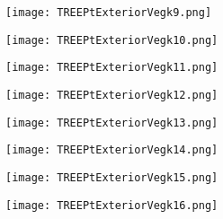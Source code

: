 \documentclass[pdf]{beamer}
\begin{document}
\begin{frame}
\begin{figure}[!h]
\centering
\texttt{[image: TREEPtExteriorVegk9.png]}
\end{figure}
\end{frame}

\begin{frame}
\begin{figure}[!h]
\centering
\texttt{[image: TREEPtExteriorVegk10.png]}
\end{figure}
\end{frame}

\begin{frame}
\begin{figure}[!h]
\centering
\texttt{[image: TREEPtExteriorVegk11.png]}
\end{figure}
\end{frame}

\begin{frame}
\begin{figure}[!h]
\centering
\texttt{[image: TREEPtExteriorVegk12.png]}
\end{figure}
\end{frame}

\begin{frame}
\begin{figure}[!h]
\centering
\texttt{[image: TREEPtExteriorVegk13.png]}
\end{figure}
\end{frame}

\begin{frame}
\begin{figure}[!h]
\centering
\texttt{[image: TREEPtExteriorVegk14.png]}
\end{figure}
\end{frame}

\begin{frame}
\begin{figure}[!h]
\centering
\texttt{[image: TREEPtExteriorVegk15.png]}
\end{figure}
\end{frame}

\begin{frame}
\begin{figure}[!h]
\centering
\texttt{[image: TREEPtExteriorVegk16.png]}
\end{figure}
\end{frame}
\end{document}
